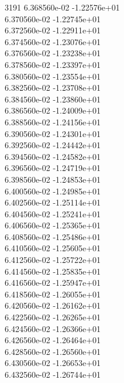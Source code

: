 3191	6.368560e-02	-1.22576e+01	\\ 	6.370560e-02	-1.22745e+01	\\ 	6.372560e-02	-1.22911e+01	\\ 	6.374560e-02	-1.23076e+01	\\ 	6.376560e-02	-1.23238e+01	\\ 	6.378560e-02	-1.23397e+01	\\ 	6.380560e-02	-1.23554e+01	\\ 	6.382560e-02	-1.23708e+01	\\ 	6.384560e-02	-1.23860e+01	\\ 	6.386560e-02	-1.24009e+01	\\ 	6.388560e-02	-1.24156e+01	\\ 	6.390560e-02	-1.24301e+01	\\ 	6.392560e-02	-1.24442e+01	\\ 	6.394560e-02	-1.24582e+01	\\ 	6.396560e-02	-1.24719e+01	\\ 	6.398560e-02	-1.24853e+01	\\ 	6.400560e-02	-1.24985e+01	\\ 	6.402560e-02	-1.25114e+01	\\ 	6.404560e-02	-1.25241e+01	\\ 	6.406560e-02	-1.25365e+01	\\ 	6.408560e-02	-1.25486e+01	\\ 	6.410560e-02	-1.25605e+01	\\ 	6.412560e-02	-1.25722e+01	\\ 	6.414560e-02	-1.25835e+01	\\ 	6.416560e-02	-1.25947e+01	\\ 	6.418560e-02	-1.26055e+01	\\ 	6.420560e-02	-1.26162e+01	\\ 	6.422560e-02	-1.26265e+01	\\ 	6.424560e-02	-1.26366e+01	\\ 	6.426560e-02	-1.26464e+01	\\ 	6.428560e-02	-1.26560e+01	\\ 	6.430560e-02	-1.26653e+01	\\ 	6.432560e-02	-1.26744e+01	\\ \hline
